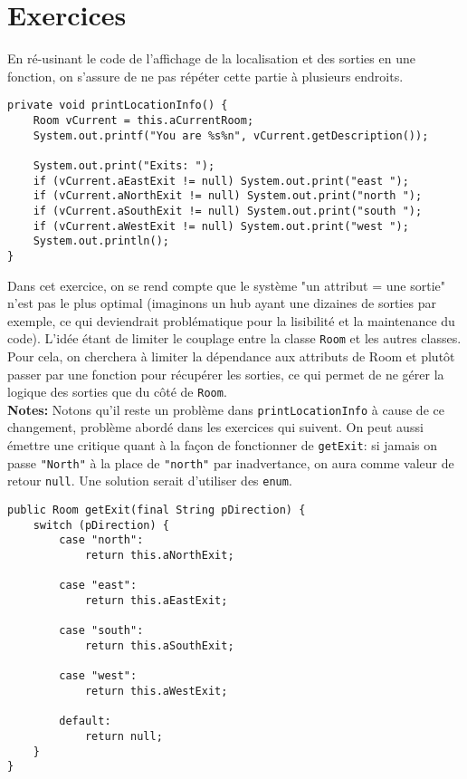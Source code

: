 \chapter{Exercices}

\setcounter{section}{7}
\setcounter{exercise}{4}


\begin{exercise}[subtitle=printLocationInfo]

En ré-usinant le code de l'affichage de la localisation et des sorties en une fonction, on s'assure de ne pas répéter cette partie à plusieurs endroits.

\begin{verbatim}
private void printLocationInfo() {
    Room vCurrent = this.aCurrentRoom;
    System.out.printf("You are %s%n", vCurrent.getDescription());
   
    System.out.print("Exits: ");
    if (vCurrent.aEastExit != null) System.out.print("east ");
    if (vCurrent.aNorthExit != null) System.out.print("north ");
    if (vCurrent.aSouthExit != null) System.out.print("south ");
    if (vCurrent.aWestExit != null) System.out.print("west ");
    System.out.println();
}
\end{verbatim}
\end{exercise}

\begin{exercise}[subtitle=getExit]

Dans cet exercice, on se rend compte que le système "un attribut = une sortie" n'est pas le plus optimal (imaginons un hub ayant une dizaines de sorties par exemple, ce qui deviendrait problématique pour la lisibilité et la maintenance du code). L'idée étant de limiter le couplage entre la classe \verb|Room| et les autres classes. Pour cela, on cherchera à limiter la dépendance aux attributs de Room et plutôt passer par une fonction pour récupérer les sorties, ce qui permet de ne gérer la logique des sorties que du côté de \verb|Room|.\\ 

\textbf{Notes:} Notons qu'il reste un problème dans \verb|printLocationInfo| à cause de ce changement, problème abordé dans les exercices qui suivent. On peut aussi émettre une critique quant à la façon de fonctionner de \verb|getExit|: si jamais on passe \verb|"North"| à la place de \verb|"north"| par inadvertance, on aura comme valeur de retour \verb|null|. Une solution serait d'utiliser des \verb|enum|.

\begin{verbatim}
public Room getExit(final String pDirection) {
    switch (pDirection) {
        case "north":
            return this.aNorthExit;

        case "east":
            return this.aEastExit;

        case "south":
            return this.aSouthExit;

        case "west":
            return this.aWestExit;

        default:
            return null;
    }
}
\end{verbatim}
\end{exercise}

